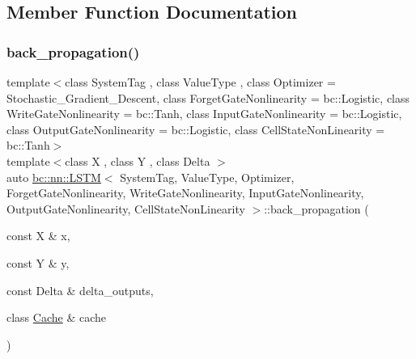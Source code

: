 \subsection{Member Function Documentation}
\mbox{\label{structbc_1_1nn_1_1LSTM_a15dc1ca2bf577ae2a22c01f1f81771e4}} 
\subsubsection{\texorpdfstring{back\+\_\+propagation()}{back\_propagation()}}
{\footnotesize\ttfamily template$<$class System\+Tag , class Value\+Type , class Optimizer  = Stochastic\+\_\+\+Gradient\+\_\+\+Descent, class Forget\+Gate\+Nonlinearity  = bc\+::\+Logistic, class Write\+Gate\+Nonlinearity  = bc\+::\+Tanh, class Input\+Gate\+Nonlinearity  = bc\+::\+Logistic, class Output\+Gate\+Nonlinearity  = bc\+::\+Logistic, class Cell\+State\+Non\+Linearity  = bc\+::\+Tanh$>$ \\
template$<$class X , class Y , class Delta $>$ \\
auto \hyperlink{structbc_1_1nn_1_1LSTM}{bc\+::nn\+::\+L\+S\+TM}$<$ System\+Tag, Value\+Type, Optimizer, Forget\+Gate\+Nonlinearity, Write\+Gate\+Nonlinearity, Input\+Gate\+Nonlinearity, Output\+Gate\+Nonlinearity, Cell\+State\+Non\+Linearity $>$\+::back\+\_\+propagation (\begin{DoxyParamCaption}\item[{const X \&}]{x,  }\item[{const Y \&}]{y,  }\item[{const Delta \&}]{delta\+\_\+outputs,  }\item[{class \hyperlink{structbc_1_1nn_1_1Cache}{Cache} \&}]{cache }\end{DoxyParamCaption})\hspace{0.3cm}{\ttfamily [inline]}}

\mbox{\label{structbc_1_1nn_1_1LSTM_a0590ad585febcdcb70978238920881b2}} 
